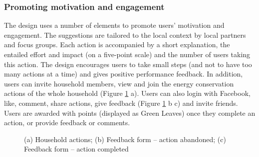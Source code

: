 \subsubsection{Promoting motivation and engagement} 
The design uses a number of elements to promote users' motivation and engagement. 
The suggestions are tailored to the local context by local partners and focus groups. 
Each action is accompanied by a short explanation, the entailed effort and impact (on a five-point scale) and the number of users taking this action. 
The design encourages users to take small steps (and not to have too many actions at a time) and gives positive performance feedback. 
In addition, users can invite household members, %
view and join the energy conservation actions of the whole household (Figure \ref{fig:form} a).
Users can also login with Facebook, like, comment, share actions, %
give feedback (Figure \ref{fig:form} b c) and invite friends. Users are awarded with points  (displayed as Green Leaves) once they complete an action, or provide feedback or comments. 






\begin{figure}
      \begin{center}
      \begin{minipage}[t!]{0.33\linewidth}    
       \end{minipage}
        \begin{minipage}[t!]{0.33\linewidth}
        \end{minipage}
        \begin{minipage}[t!]{0.31\linewidth}
                \end{minipage}
      \end{center}
      \caption{(a) Household actions; (b) Feedback form -- action abandoned; (c) Feedback form -- action completed}\label{fig:form}
\end{figure}

